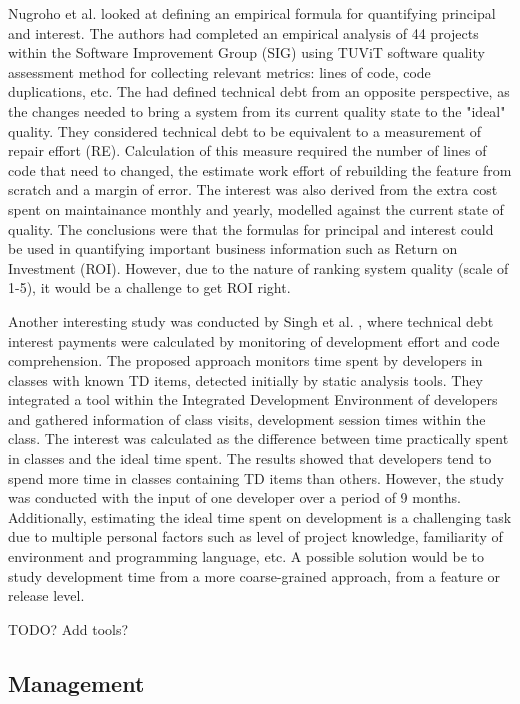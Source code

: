 \documentclass{mprop}
\begin{document}
Nugroho et al. \cite{Nugroho2011} looked at defining an empirical formula for
quantifying principal and interest. The authors had completed an empirical
analysis of 44 projects within the Software Improvement Group (SIG) using TUViT
software quality assessment method for collecting relevant metrics: lines of
code, code duplications, etc. The had defined technical debt from an opposite
perspective, as the changes needed to bring a system from its current quality
state to the "ideal" quality. They considered technical debt to be equivalent to
a measurement of repair effort (RE). Calculation of this measure required the
number of lines of code that need to changed, the estimate work effort of
rebuilding the feature from scratch and a margin of error. The interest was also
derived from the extra cost spent on maintainance monthly and yearly, modelled
against the current state of quality. The conclusions were that the formulas for
principal and interest could be used in quantifying important business
information such as Return on Investment (ROI). However, due to the nature of
ranking system quality (scale of 1-5), it would be a challenge to get ROI right.


Another interesting study was conducted by Singh et al. \cite{Singh2014}, where
technical debt interest payments were calculated by monitoring of development
effort and code comprehension. The proposed approach monitors time spent by
developers in classes with known TD items, detected initially by static analysis
tools. They integrated a tool within the Integrated Development Environment of
developers and gathered information of class visits, development session times
within the class. The interest was calculated as the difference between time
practically spent in classes and the ideal time spent. The results showed that
developers tend to spend more time in classes containing TD items than others.
However, the study was conducted with the input of one developer over a period
of 9 months. Additionally, estimating the ideal time spent on development is a
challenging task due to multiple personal factors such as level of project
knowledge, familiarity of environment and programming language, etc. A possible
solution would be to study development time from a more coarse-grained approach,
from a feature or release level.


TODO? Add tools?

\subsection{Management}
\end{document}
